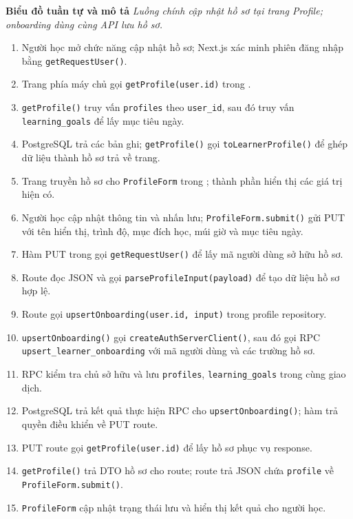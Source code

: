 \documentclass[12pt,a4paper,oneside]{report}
\begin{document}
\noindent\textbf{Biểu đồ tuần tự và mô tả}
\noindent\textit{Luồng chính cập nhật hồ sơ tại trang Profile; onboarding dùng cùng API lưu hồ sơ.}
\begin{enumerate}
    \item Người học mở chức năng cập nhật hồ sơ; Next.js xác minh phiên đăng nhập bằng \texttt{getRequestUser()}.
    \item Trang phía máy chủ gọi \texttt{getProfile(user.id)} trong .
    \item \texttt{getProfile()} truy vấn \texttt{profiles} theo \texttt{user\_id}, sau đó truy vấn \texttt{learning\_goals} để lấy mục tiêu ngày.
    \item PostgreSQL trả các bản ghi; \texttt{getProfile()} gọi \texttt{toLearnerProfile()} để ghép dữ liệu thành hồ sơ trả về trang.
    \item Trang truyền hồ sơ cho \texttt{ProfileForm} trong ; thành phần hiển thị các giá trị hiện có.
    \item Người học cập nhật thông tin và nhấn lưu; \texttt{ProfileForm.submit()} gửi PUT  với tên hiển thị, trình độ, mục đích học, múi giờ và mục tiêu ngày.
    \item Hàm PUT trong  gọi \texttt{getRequestUser()} để lấy mã người dùng sở hữu hồ sơ.
    \item Route đọc JSON và gọi \texttt{parseProfileInput(payload)} để tạo dữ liệu hồ sơ hợp lệ.
    \item Route gọi \texttt{upsertOnboarding(user.id, input)} trong profile repository.
    \item \texttt{upsertOnboarding()} gọi \texttt{createAuthServerClient()}, sau đó gọi RPC \texttt{upsert\_learner\_onboarding} với mã người dùng và các trường hồ sơ.
    \item RPC kiểm tra chủ sở hữu và lưu \texttt{profiles}, \texttt{learning\_goals} trong cùng giao dịch.
    \item PostgreSQL trả kết quả thực hiện RPC cho \texttt{upsertOnboarding()}; hàm trả quyền điều khiển về PUT route.
    \item PUT route gọi \texttt{getProfile(user.id)} để lấy hồ sơ phục vụ response.
    \item \texttt{getProfile()} trả DTO hồ sơ cho route; route trả JSON chứa \texttt{profile} về \texttt{ProfileForm.submit()}.
    \item \texttt{ProfileForm} cập nhật trạng thái lưu và hiển thị kết quả cho người học.
\end{enumerate}
\end{document}
